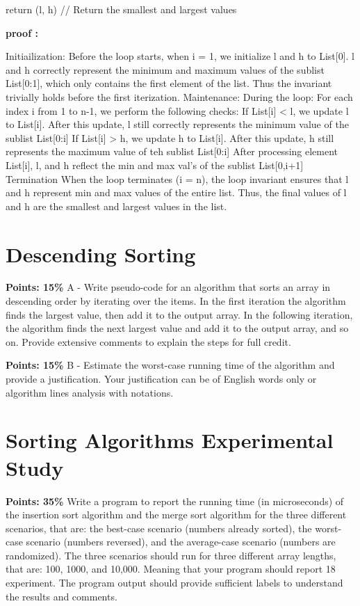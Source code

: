 \documentclass{article}
\begin{document}
    return (l, h)   // Return the smallest and largest values


\textbf{proof :} 

		Initiailization:
			Before the loop starts, when i = 1, we initialize l and h to List[0].
			l and h correctly represent the minimum and maximum values of the sublist List[0:1], which only contains the first element of the list.
Thus the invariant trivially holds before the first iterization.
		Maintenance:
			During the loop: For each index i from 1 to n-1, we perform the following checks:
				If List[i] < l, we update l to List[i]. After this update, l still correctly represents the minimum value of the sublist List[0:i]
				If List[i] > h, we update h to List[i]. After this update, h still represents the maximum value of teh sublist List[0:i]
			After processing element List[i], l, and h reflect the min and max val's of the sublist List[0,i+1]
		Termination
			When the loop terminates (i = n), the loop invariant ensures that l and h represent min and max values of the entire list.
			Thus, the final values of l and h are the smallest and largest values in the list.


\section{Descending Sorting}

\textbf{Points: 15\%} A - Write pseudo-code for an algorithm that sorts an array in descending order by iterating over the items. In the first iteration the algorithm finds the largest value, then add it to the output array. In the following iteration, the algorithm finds the next largest value and add it to the output array, and so on. Provide extensive comments to explain the steps for full credit.

\textbf{Points: 15\%} B - Estimate the worst-case running time of the algorithm and provide a justification. Your justification can be of English words only or algorithm lines analysis with notations.

\section{Sorting Algorithms Experimental Study}

\textbf{Points: 35\%} Write a program to report the running time (in microseconds) of the insertion sort algorithm and the merge sort algorithm for the three different scenarios, that are: the best-case scenario (numbers already sorted), the worst-case scenario (numbers reversed), and the average-case scenario (numbers are randomized). The three scenarios should run for three different array lengths, that are: 100, 1000, and 10,000. Meaning that your program should report 18 experiment. The program output should provide sufficient labels to understand the results and comments.
\end{document}
